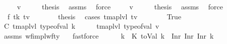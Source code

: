 \begin{isabellebody}
\ \ \isamarkupfalse%
\ {\isacharparenleft}{\kern0pt}{}\ v{\isacharparenright}{\kern0pt}\isanewline
\ \ \isamarkupfalse%
\ \isamarkupfalse%
\ {\isacharquery}{\kern0pt}thesis\ \isamarkupfalse%
\ assms\ \isamarkupfalse%
\ force\isanewline
{}\isamarkupfalse%
\isanewline
\ \ \isamarkupfalse%
\ {\isacharparenleft}{\kern0pt}{}\ v{\isacharparenright}{\kern0pt}\isanewline
\ \ \isamarkupfalse%
\ \isamarkupfalse%
\ {\isacharquery}{\kern0pt}thesis\ \isamarkupfalse%
\ assms\ \isamarkupfalse%
\ force\isanewline
{}\isamarkupfalse%
\isanewline
\ \ \isamarkupfalse%
\ {\isacharparenleft}{\kern0pt}{}\ f\ tk\ tv{\isacharparenright}{\kern0pt}\ \ \isanewline
\ \ \isamarkupfalse%
\ \isamarkupfalse%
\ {\isacharquery}{\kern0pt}thesis\ \isamarkupfalse%
\ {\isacharparenleft}{\kern0pt}cases\ {\isachardoublequoteopen}{\isacharparenleft}{\kern0pt}tmap{\isacharunderscore}{\kern0pt}lvl\ tv\ {\isasymle}\ {}{\isacharparenright}{\kern0pt}{\isachardoublequoteclose}{\isacharparenright}{\kern0pt}\isanewline
\ \ \ \ \isamarkupfalse%
\ True\isanewline
\ \ \ \ \isamarkupfalse%
\ \isamarkupfalse%
\ C{\isacharcolon}{\kern0pt}\ {\isachardoublequoteopen}tmap{\isacharunderscore}{\kern0pt}lvl\ {\isacharparenleft}{\kern0pt}type{\isacharunderscore}{\kern0pt}of{\isacharunderscore}{\kern0pt}val\ k{\isacharparenright}{\kern0pt}\ {\isacharequal}{\kern0pt}\ {}\ \ {\isasymand}\ \ tmap{\isacharunderscore}{\kern0pt}lvl\ {\isacharparenleft}{\kern0pt}type{\isacharunderscore}{\kern0pt}of{\isacharunderscore}{\kern0pt}val\ v{\isacharparenright}{\kern0pt}\ {\isasymle}\ {}{\isachardoublequoteclose}\isanewline
\ \ \ \ \ \ \isamarkupfalse%
\ assms\ wf{\isacharunderscore}{\kern0pt}impl{\isacharunderscore}{\kern0pt}wf{\isacharunderscore}{\kern0pt}ty\ {\isachardoublequoteopen}{}{\isachardoublequoteclose}\ \isamarkupfalse%
\ fastforce\isanewline
\ \ \ \ \isamarkupfalse%
\ k{\isacharprime}{\kern0pt}\ \ K{\isacharcolon}{\kern0pt}\ {\isachardoublequoteopen}toVal{}{}{}{}\ k\ {\isacharequal}{\kern0pt}\ Inr\ {\isacharparenleft}{\kern0pt}Inr\ {\isacharparenleft}{\kern0pt}Inr\ k{\isacharprime}{\kern0pt}{\isacharparenright}{\kern0pt}{\isacharparenright}{\kern0pt}{\isachardoublequoteclose}\isanewline

\end{isabellebody}
